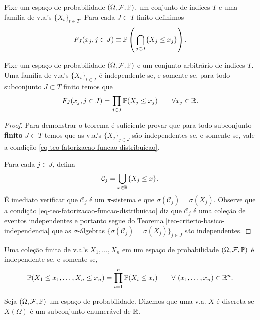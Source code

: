 Fixe um espaço de probabilidade $(\Omega,\F,\P)$,
um conjunto de índices $T$ e uma família de v.a.'s   
$\{X_t\}_{t\in T}$. Para cada $J\subset T$ finito
definimos  
	\[
		F_J(x_j, j\in J) 
		\equiv 
		\P \left(\, \bigcap_{j\in J} \{X_j\leq x_j\} \right).
	\]

\begin{teorema}
	Fixe um espaço de probabilidade $(\Omega,\F,\P)$ e
	um conjunto arbitrário de índices $T$.
	Uma família de v.a.'s $\{X_t\}_{t\in T}$ é independente
	se, e somente se, para todo subconjunto $J\subset T$ 
	finito temos que 
		\begin{equation}\label{eq-teo-fatorizacao-funcao-distribuicao}
			F_{J}(x_j,j\in J) = \prod_{j\in J}\P(X_j\leq x_j)
			\qquad
			\forall x_j\in \R.		
		\end{equation}
\end{teorema}


\begin{proof}
Para demonstrar o teorema é suficiente provar que 
para todo subconjunto {\bf finito} $J\subset T$ temos que 
as v.a.'s $\{X_j\}_{j\in J}$ são independentes
se, e somente se, vale a condição 
\eqref{eq-teo-fatorizacao-funcao-distribuicao}.

Para cada $j\in J$, defina 
	\[
		\mathcal{C}_j
		=
		\bigcup_{x\in\R} \{X_j\leq x\}.
	\]
É imediato verificar que $\mathcal{C}_j$	é 
um $\pi$-sistema e que 
$\sigma(\mathcal{C}_j)=\sigma(X_j)$.
Observe que a condição 
\eqref{eq-teo-fatorizacao-funcao-distribuicao}
diz que $\mathcal{C}_j$ é uma coleção de eventos
independentes e portanto segue do 
Teorema \ref{teo-criterio-basico-independencia}
que as $\sigma$-álgebras 
$\{ \sigma(\mathcal{C}_j)=\sigma(X_j)\}_{j\in J}$
são independentes. 	
\end{proof}





\begin{corolario}
	Uma coleção finita de v.a.'s $X_1,\ldots,X_n$
	em um espaço de probabilidade $(\Omega,\F,\P)$ é
	independente se, e somente se, 
		\[
			\P(X_1\leq x_1,\ldots, X_n\leq x_n)
			=
			\prod_{i=1}^n \P(X_i\leq x_i)
			\qquad
			\forall\ (x_1,\ldots,x_n)\in\R^n.
		\]
\end{corolario}


\begin{definicao}
\label{def-var-aleatoria-discreta}
Seja $(\Omega,\F,\P)$ um espaço de probabilidade.
Dizemos que uma v.a. $X$ é discreta se $X(\Omega)$ 
é um subconjunto enumerável de $\R$.
\end{definicao}


